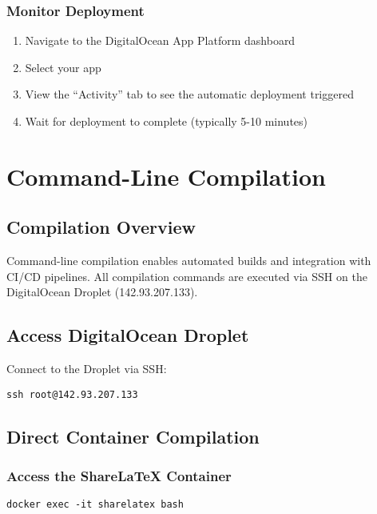 \subsubsection{Monitor Deployment}

\begin{enumerate}
    \item Navigate to the DigitalOcean App Platform dashboard
    \item Select your app
    \item View the ``Activity'' tab to see the automatic deployment triggered
    \item Wait for deployment to complete (typically 5-10 minutes)
\end{enumerate}

\section{Command-Line Compilation}

\subsection{Compilation Overview}

Command-line compilation enables automated builds and integration with CI/CD pipelines. All compilation commands are executed via SSH on the DigitalOcean Droplet (142.93.207.133).

\subsection{Access DigitalOcean Droplet}

Connect to the Droplet via SSH:

\begin{verbatim}
ssh root@142.93.207.133
\end{verbatim}

\subsection{Direct Container Compilation}

\subsubsection{Access the ShareLaTeX Container}

\begin{verbatim}
docker exec -it sharelatex bash
\end{verbatim}

